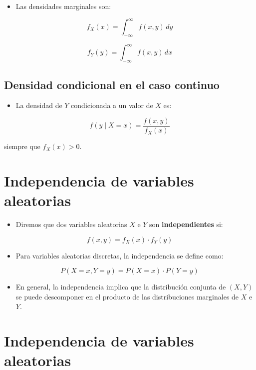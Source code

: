 \documentclass[
  a4paper,
  DIV=11,
  numbers=noendperiod]{scrreprt}
\providecommand{\tightlist}{%
  \setlength{\itemsep}{0pt}\setlength{\parskip}{0pt}}\usepackage{longtable,booktabs,array}
\begin{document}
\begin{itemize}
\tightlist
\item
  Las densidades marginales son:
\end{itemize}

\[
f_X(x) = \int_{-\infty}^{\infty} f(x, y) \, dy
\]

\[
f_Y(y) = \int_{-\infty}^{\infty} f(x, y) \, dx
\]

\subsection{Densidad condicional en el caso
continuo}\label{densidad-condicional-en-el-caso-continuo}

\begin{itemize}
\tightlist
\item
  La densidad de \(Y\) condicionada a un valor de \(X\) es:
\end{itemize}

\[
f(y \mid X = x) = \frac{f(x, y)}{f_X(x)}
\]

siempre que \(f_X(x) > 0\).

\section{Independencia de variables
aleatorias}\label{independencia-de-variables-aleatorias}

\begin{itemize}
\tightlist
\item
  Diremos que dos variables aleatorias \(X\) e \(Y\) son
  \textbf{independientes} si:
\end{itemize}

\[
f(x, y) = f_X(x) \cdot f_Y(y)
\]

\begin{itemize}
\tightlist
\item
  Para variables aleatorias discretas, la independencia se define como:
\end{itemize}

\[
P(X = x, Y = y) = P(X = x) \cdot P(Y = y)
\]

\begin{itemize}
\tightlist
\item
  En general, la independencia implica que la distribución conjunta de
  \((X, Y)\) se puede descomponer en el producto de las distribuciones
  marginales de \(X\) e \(Y\).
\end{itemize}

\section{Independencia de variables
aleatorias}\label{independencia-de-variables-aleatorias-1}
\end{document}
